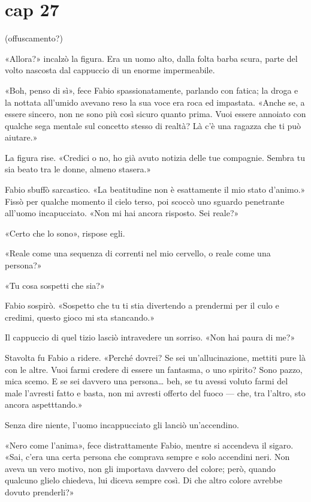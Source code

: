 \chapter{cap 27} 

(offuscamento?)

«Allora?» incalzò la figura. Era un uomo alto, dalla folta barba scura,
parte del volto nascosta dal cappuccio di un enorme impermeabile.

«Boh, penso di sì», fece Fabio spassionatamente, parlando con fatica; la
droga e la nottata all'umido avevano reso la sua voce era roca ed
impastata. «Anche se, a essere sincero, non ne sono più così sicuro
quanto prima. Vuoi essere annoiato con qualche sega mentale sul concetto
stesso di realtà? Là c'è una ragazza che ti può aiutare.»

La figura rise. «Credici o no, ho già avuto notizia delle tue compagnie.
Sembra tu sia beato tra le donne, almeno stasera.»

Fabio sbuffò sarcastico. «La beatitudine non è esattamente il mio stato
d'animo.» Fissò per qualche momento il cielo terso, poi scoccò uno
sguardo penetrante all'uomo incapucciato. «Non mi hai ancora risposto.
Sei reale?»

«Certo che lo sono», rispose egli.

«Reale come una sequenza di correnti nel mio cervello, o reale come una
persona?»

«Tu cosa sospetti che sia?»

Fabio sospirò. «Sospetto che tu ti stia divertendo a prendermi per il
culo e credimi, questo gioco mi sta stancando.»

Il cappuccio di quel tizio lasciò intravedere un sorriso. «Non hai paura
di me?»

Stavolta fu Fabio a ridere. «Perché dovrei? Se sei un'allucinazione,
mettiti pure là con le altre. Vuoi farmi credere di essere un fantasma,
o uno spirito? Sono pazzo, mica scemo. E se sei davvero una
persona\ldots{} beh, se tu avessi voluto farmi del male l'avresti fatto
e basta, non mi avresti offerto del fuoco --- che, tra l'altro, sto
ancora aspetttando.»

Senza dire niente, l'uomo incappucciato gli lanciò un'accendino.

«Nero come l'anima», fece distrattamente Fabio, mentre si accendeva il
sigaro. «Sai, c'era una certa persona che comprava sempre e solo
accendini neri. Non aveva un vero motivo, non gli importava davvero del
colore; però, quando qualcuno glielo chiedeva, lui diceva sempre così.
Di che altro colore avrebbe dovuto prenderli?»

